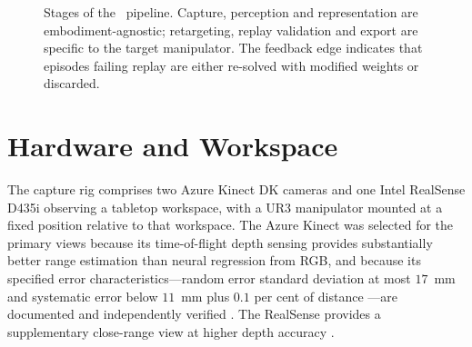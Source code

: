\begin{figure}[htbp]
\centering
{}
\caption{Stages of the \viki\ pipeline. Capture, perception and representation
are embodiment-agnostic; retargeting, replay validation and export are
specific to the target manipulator. The feedback edge indicates that episodes
failing replay are either re-solved with modified weights or discarded.}
\label{fig:pipeline}
\end{figure}

\section{Hardware and Workspace}
\label{sec:hardware}

The capture rig comprises two Azure Kinect DK cameras and one Intel RealSense
D435i observing a tabletop workspace, with a UR3 manipulator mounted at a fixed
position relative to that workspace. The Azure Kinect was selected for the
primary views because its time-of-flight depth sensing provides substantially
better range estimation than neural regression from RGB, and because its
specified error characteristics---random error standard deviation at most
$17$~mm and systematic error below $11$~mm plus $0.1$ per cent of distance
\cite{mskinect}---are documented and independently verified \cite{tolgyessy}.
The RealSense provides a supplementary close-range view at higher depth
accuracy \cite{intel}.

